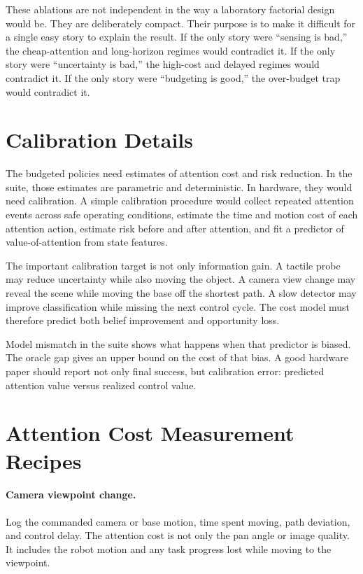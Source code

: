 \documentclass{article}
\begin{document}
These ablations are not independent in the way a laboratory factorial design
would be. They are deliberately compact. Their purpose is to make it difficult
for a single easy story to explain the result. If the only story were ``sensing
is bad,'' the cheap-attention and long-horizon regimes would contradict it. If
the only story were ``uncertainty is bad,'' the high-cost and delayed regimes
would contradict it. If the only story were ``budgeting is good,'' the
over-budget trap would contradict it.

\section{Calibration Details}

The budgeted policies need estimates of attention cost and risk reduction. In
the suite, those estimates are parametric and deterministic. In hardware, they
would need calibration. A simple calibration procedure would collect repeated
attention events across safe operating conditions, estimate the time and motion
cost of each attention action, estimate risk before and after attention, and
fit a predictor of value-of-attention from state features.

The important calibration target is not only information gain. A tactile probe
may reduce uncertainty while also moving the object. A camera view change may
reveal the scene while moving the base off the shortest path. A slow detector
may improve classification while missing the next control cycle. The cost
model must therefore predict both belief improvement and opportunity loss.

Model mismatch in the suite shows what happens when that predictor is biased.
The oracle gap gives an upper bound on the cost of that bias. A good hardware
paper should report not only final success, but calibration error: predicted
attention value versus realized control value.

\section{Attention Cost Measurement Recipes}

\paragraph{Camera viewpoint change.}
Log the commanded camera or base motion, time spent moving, path deviation,
and control delay. The attention cost is not only the pan angle or image
quality. It includes the robot motion and any task progress lost while moving
to the viewpoint.
\end{document}
